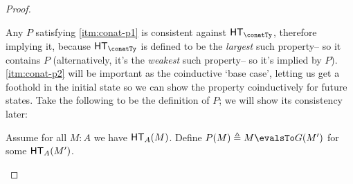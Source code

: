 \documentclass[letterpaper]{article}
\begin{document}
\begin{proof}
\begin{enumerate}
            Any $P$ satisfying \ref{itm:conat-p1} is consistent against
            $\HT[\conatTy]$, therefore implying it, because $\HT[\conatTy]$ is
            defined to be the \textit{largest} such property-- so it contains
            $P$ (alternatively, it's the \textit{weakest} such property-- so
            it's implied by $P$). \ref{itm:conat-p2} will be important as the
            coinductive `base case', letting us get a foothold in the initial
            state so we can show the property coinductively for future states.
            Take the following to be the definition of $P$; we will show its
            consistency later:

            \begin{definition}[Definition of $P$]
                Assume for all $M : A$ we have $\HT[A](M)$.
                Define $P(M) \triangleq M \evalsTo G(M')$ for some $\HT[A](M')$.
            \end{definition}





\end{enumerate}
\end{proof}
\end{document}
